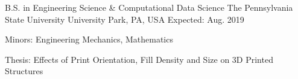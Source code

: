 
\begin{cventries}

	\cventry
	{B.S. in Engineering Science \& Computational Data Science} %
	{The Pennsylvania State University} %
	{University Park, PA, USA} %
	{Expected: Aug. 2019} %
	{
		\begin{cvitems} %
			\item {Minors: Engineering Mechanics, Mathematics}
			\item {Thesis: Effects of Print Orientation, Fill Density and Size on 3D Printed Structures}
		\end{cvitems}
	}
	
\end{cventries}